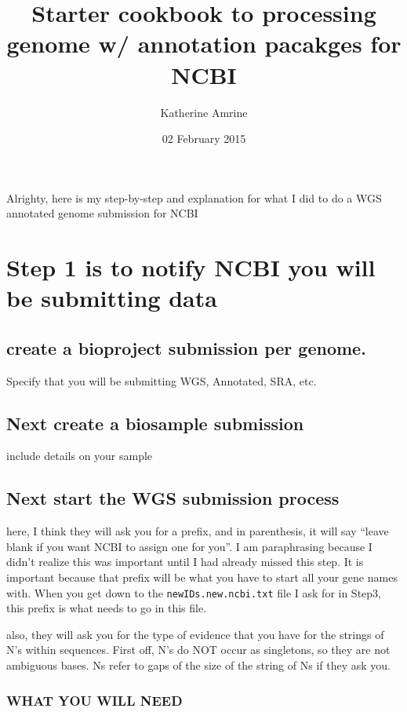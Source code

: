 \documentclass[11pt]{article}
\title{Starter cookbook to processing genome w/ annotation pacakges for NCBI}
\author{Katherine Amrine}
\date{02 February 2015}
\begin{document}
\maketitle


 Alrighty, here is my step-by-step and explanation for what I did to
 do a WGS annotated genome submission for NCBI

\section*{Step 1 is to notify NCBI you will be submitting data}
\label{sec-1}


\subsection*{create a bioproject submission per genome.}
\label{sec-1.1}

Specify that you will be submitting WGS, Annotated, SRA, etc. 

\subsection*{Next create a biosample submission}
\label{sec-1.2}

   include details on your sample
   
\subsection*{Next start the WGS submission process}
\label{sec-1.3}

   here, I think they will ask you for a prefix, and in parenthesis, it will say
   ``leave blank if you want NCBI to assign one for you''. I am paraphrasing because
   I didn't realize this was important until I had already missed this step. 
   It is important because that prefix will be what you have to start all your gene
   names with. When you get down to the \texttt{newIDs.new.ncbi.txt} file I ask for in Step3,
   this prefix is what needs to go in this file. 

   also, they will ask you for the type of evidence that you have for the strings of 
   N's within sequences. First off, N's do NOT occur as singletons, so they are not 
   ambiguous bases. Ns refer to gaps of the size of the string of Ns if they ask you. 
\subsubsection*{WHAT YOU WILL NEED}
\label{sec-1.3.1}
\end{document}
